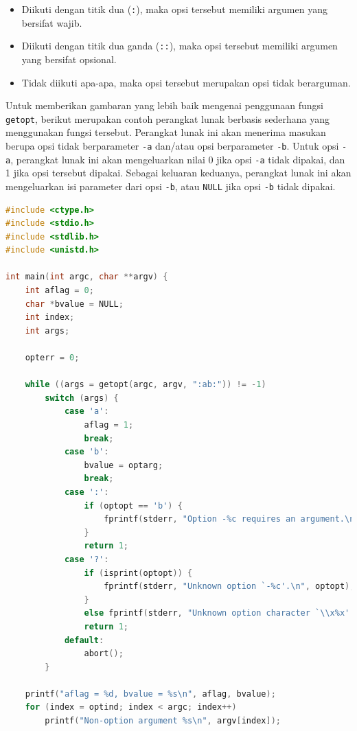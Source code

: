 \documentclass[a4paper,twoside]{article}
\begin{document}
\begin{enumerate}
\begin{itemize}
	\begin{itemize}
		\item Diikuti dengan titik dua (\verb|:|), maka opsi tersebut memiliki argumen yang bersifat wajib.
		\item Diikuti dengan titik dua ganda (\verb|::|), maka opsi tersebut memiliki argumen yang bersifat opsional.
		\item Tidak diikuti apa-apa, maka opsi tersebut merupakan opsi tidak berarguman.
	\end{itemize}
	
\end{itemize}
\noindent
Untuk memberikan gambaran yang lebih baik mengenai penggunaan fungsi \verb|getopt|, berikut merupakan contoh perangkat lunak berbasis \cl sederhana yang menggunakan fungsi tersebut. Perangkat lunak ini akan menerima masukan berupa opsi tidak berparameter \verb|-a| dan/atau opsi berparameter \verb|-b|. Untuk opsi \verb|-a|, perangkat lunak ini akan mengeluarkan nilai 0 jika opsi \verb|-a| tidak dipakai, dan 1 jika opsi tersebut dipakai. Sebagai keluaran keduanya, perangkat lunak ini akan mengeluarkan isi parameter dari opsi \verb|-b|, atau \verb|NULL| jika opsi \verb|-b| tidak dipakai.

\begin{lstlisting}[language=C, caption=Contoh sederhana penggunaan getopt, label=code:getopt-usage]
#include <ctype.h>
#include <stdio.h>
#include <stdlib.h>
#include <unistd.h>

int main(int argc, char **argv) {
    int aflag = 0;
    char *bvalue = NULL;
    int index;
    int args;

    opterr = 0;

    while ((args = getopt(argc, argv, ":ab:")) != -1)
        switch (args) {
	        case 'a':
	            aflag = 1;
	            break;
	        case 'b':
	            bvalue = optarg;
	            break;
	        case ':':
    	        if (optopt == 'b') {
	                fprintf(stderr, "Option -%c requires an argument.\n", optopt);
	            }
	            return 1;
	        case '?':
	            if (isprint(optopt)) {
	                fprintf(stderr, "Unknown option `-%c'.\n", optopt);
	            }
	            else fprintf(stderr, "Unknown option character `\\x%x'.\n", optopt);
	            return 1;
	        default:
	            abort();
        }

    printf("aflag = %d, bvalue = %s\n", aflag, bvalue);
    for (index = optind; index < argc; index++)
        printf("Non-option argument %s\n", argv[index]);


\end{lstlisting}
\end{enumerate}
\end{document}

